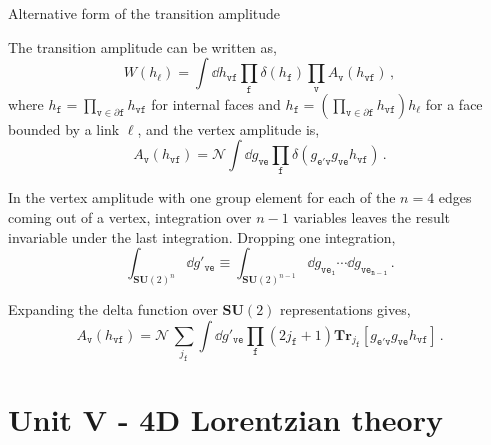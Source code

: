 \documentclass{beamer}
\begin{document}
\begin{frame}{Alternative form of the transition amplitude}
    \begin{list}{\maltese}{\leftmargin=1em \itemindent=0em}
        \item<1-> The transition amplitude can be written as,\vspace{-4pt}
        \begin{equation}
            W(h_\ell)=\int\dd{h_\mathtt{vf}}\prod_\mathtt{f}\delta(h_\mathtt{f})\prod_\mathtt{v}A_\mathtt{v}(h_\mathtt{vf})\,,
        \end{equation}
        where $h_\mathtt{f}=\prod\limits_{\mathtt{v}\in\partial\mathtt{f}}h_\mathtt{vf}$ for internal faces and $h_\mathtt{f}=\left(\prod\limits_{\mathtt{v}\in\partial\mathtt{f}}h_\mathtt{vf}\right)h_\ell$ for a face bounded by a link $\ell$, and the vertex amplitude is,\vspace{-4pt}
        \begin{equation}
            A_\mathtt{v}(h_\mathtt{vf})=\mathcal{N}\int\dd{g_\mathtt{ve}}\prod_\mathtt{f}\delta(g_\mathtt{e'v}g_\mathtt{ve}h_\mathtt{vf})\,.
        \end{equation}
        \item<2-> In the vertex amplitude with one group element for each of the $n=4$ edges coming out of a vertex, integration over $n-1$ variables leaves the result invariable under the last integration. Dropping one integration,\vspace{-3pt}
        \begin{equation}
            \int_{{\mathbf{SU}(2)}^n}\dd{g'_{\mathtt{ve}}}\equiv\int_{{\mathbf{SU}(2)}^{n-1}}\dd{g_{\mathtt{ve_1}}}\cdots\dd{g_{\mathtt{ve_{n-1}}}}\,.
        \end{equation}
        \item<3-> Expanding the delta function over $\mathbf{SU}(2)$ representations gives,\vspace{-4pt}
        \begin{equation}
            A_\mathtt{v}(h_\mathtt{vf})=\mathcal{N}\,\sum_{j_\mathtt{f}}\int\dd{g'_\mathtt{ve}}\prod_\mathtt{f}(2j_\mathtt{f}+1)\mathbf{Tr}_{j_\mathtt{f}}[g_\mathtt{e'v}g_\mathtt{ve}h_\mathtt{vf}]\,.
        \end{equation}
    \end{list}
\end{frame}

\section{Unit V - 4D Lorentzian theory}
\end{document}
